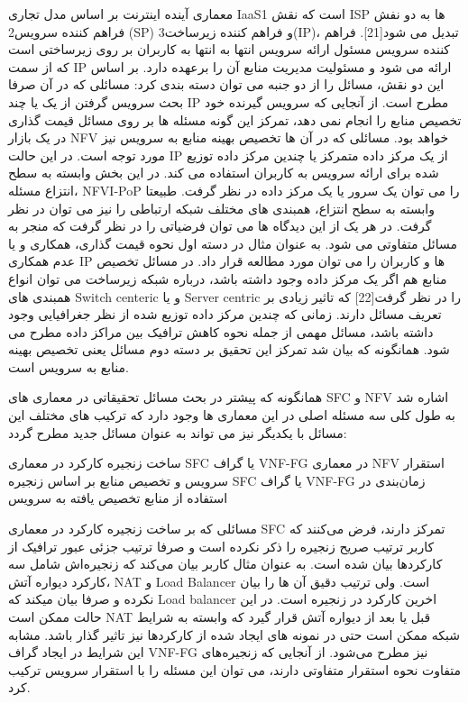 معماری آینده اینترنت بر اساس مدل تجاری IaaS1 است که نقش ISP ها به دو نفش فراهم کننده سرویس2 (SP) و فراهم کننده زیرساخت3(IP)، تبدیل می شود[21]. فراهم کننده سرویس مسئول ارائه سرویس انتها به انتها به کاربران بر روی زیرساختی است که از سمت IP ارائه می شود و مسئولیت مدیریت منابع آن را برعهده دارد. بر اساس این دو نقش، مسائل را از دو جنبه می توان دسته بندی کرد:
 مسائلی که در آن صرفا بحث سرویس گرفتن از یک یا چند IP مطرح است. از آنجایی که سرویس گیرنده خود تخصیص منابع را انجام نمی دهد، تمرکز این گونه مسئله ها بر روی مسائل قیمت گذاری در یک بازار NFV خواهد بود.
 مسائلی که در آن ها تخصیص بهینه منابع به سرویس نیز مورد توجه است. در این حالت IP از یک مرکز داده متمرکز یا چندین مرکز داده توزیع شده برای ارائه سرویس به کاربران استفاده می کند.  در این بخش وابسته به سطح  انتزاع مسئله، NFVI-PoP را می توان یک سرور یا یک مرکز داده در نظر گرفت. طبیعتا وابسته به سطح انتزاع، همبندی های مختلف شبکه ارتباطی را نیز می توان در نظر گرفت.
در هر یک از این دیدگاه ها می توان فرضیاتی را در نظر گرفت که منجر به مسائل متفاوتی می شود. به عنوان مثال در دسته اول نحوه قیمت گذاری، همکاری و یا عدم همکاری IP ها و کاربران را می توان مورد مطالعه قرار داد. در مسائل تخصیص منابع هم اگر یک مرکز داده وجود داشته باشد، درباره شبکه زیرساخت می توان انواع همبندی های Switch centeric و یا Server centric را در نظر گرفت[22] که تاثیر زیادی بر تعریف مسائل دارند. زمانی که چندین مرکز داده توزیع شده از نظر جغرافیایی وجود داشته باشد، مسائل مهمی از جمله نحوه کاهش ترافیک بین مراکز داده مطرح می شود. همانگونه که بیان شد تمرکز این تحقیق بر دسته دوم مسائل یعنی تخصیص بهینه منابع به سرویس است.



همانگونه که پیشتر در بحث مسائل تحقیقاتی در معماری های SFC و NFV اشاره شد به طول کلی سه مسئله اصلی در این معماری ها وجود دارد که ترکیب های مختلف این مسائل با یکدیگر نیز می تواند به عنوان مسائل جدید مطرح گردد:

 ساخت زنجیره کارکرد در معماری SFC یا گراف VNF-FG در معماری NFV
 استقرار سرویس و تخصیص منابع بر اساس زنجیره SFC یا گراف VNF-FG
 زمان‌بندی در استفاده از منابع تخصیص یافته به سرویس

مسائلی که بر ساخت زنجیره کارکرد در معماری SFC تمرکز دارند، فرض می‌کنند که کاربر ترتیب صریح زنجیره را ذکر نکرده است و صرفا ترتیب جزئی عبور ترافیک از کارکردها بیان شده است.
به عنوان مثال کاربر بیان می‌کند که زنجیره‌اش شامل سه کارکرد دیواره آتش، NAT و Load Balancer است. ولی ترتیب دقیق آن ها را بیان نکرده و صرفا بیان میکند که Load balancer اخرین کارکرد در زنجیره است.
در این حالت ممکن است NAT قبل یا بعد از دیواره آتش قرار گیرد که وابسته به شرایط شبکه ممکن است حتی در نمونه های ایجاد شده از کارکردها نیز تاثیر گذار باشد.
مشابه این شرایط در ایجاد گراف VNF-FG نیز مطرح می‌شود. از آنجایی که زنجیره‌های متفاوت نحوه استقرار متفاوتی دارند، می توان این مسئله را با استقرار سرویس ترکیب کرد.

